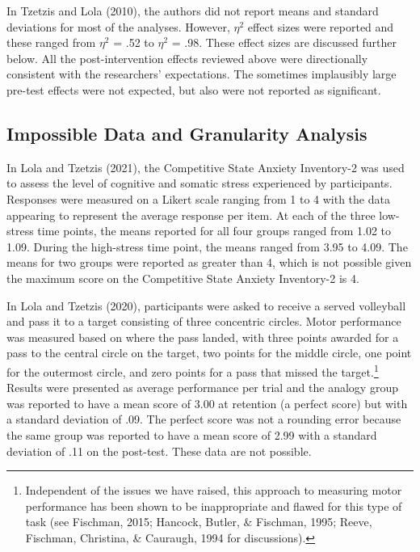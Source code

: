 \documentclass[
  english,
  man, donotrepeattitle,floatsintext]{apa7}
\begin{document}
In Tzetzis and Lola (2010), the authors did not report means and standard deviations for most of the analyses. However, \(\eta^{2}\) effect sizes were reported and these ranged from \(\eta^{2}\) = .52 to \(\eta^{2}\) = .98. These effect sizes are discussed further below. All the post-intervention effects reviewed above were directionally consistent with the researchers' expectations. The sometimes implausibly large pre-test effects were not expected, but also were not reported as significant.

\hypertarget{impossible-data-and-granularity-analysis}{%
\subsection{Impossible Data and Granularity Analysis}\label{impossible-data-and-granularity-analysis}}

In Lola and Tzetzis (2021), the Competitive State Anxiety Inventory-2 was used to assess the level of cognitive and somatic stress experienced by participants. Responses were measured on a Likert scale ranging from 1 to 4 with the data appearing to represent the average response per item. At each of the three low-stress time points, the means reported for all four groups ranged from 1.02 to 1.09. During the high-stress time point, the means ranged from 3.95 to 4.09. The means for two groups were reported as greater than 4, which is not possible given the maximum score on the Competitive State Anxiety Inventory-2 is 4.

In Lola and Tzetzis (2020), participants were asked to receive a served volleyball and pass it to a target consisting of three concentric circles. Motor performance was measured based on where the pass landed, with three points awarded for a pass to the central circle on the target, two points for the middle circle, one point for the outermost circle, and zero points for a pass that missed the target.\footnote{Independent of the issues we have raised, this approach to measuring motor performance has been shown to be inappropriate and flawed for this type of task (see Fischman, 2015; Hancock, Butler, \& Fischman, 1995; Reeve, Fischman, Christina, \& Cauraugh, 1994 for discussions).} Results were presented as average performance per trial and the analogy group was reported to have a mean score of 3.00 at retention (a perfect score) but with a standard deviation of .09. The perfect score was not a rounding error because the same group was reported to have a mean score of 2.99 with a standard deviation of .11 on the post-test. These data are not possible.
\end{document}
